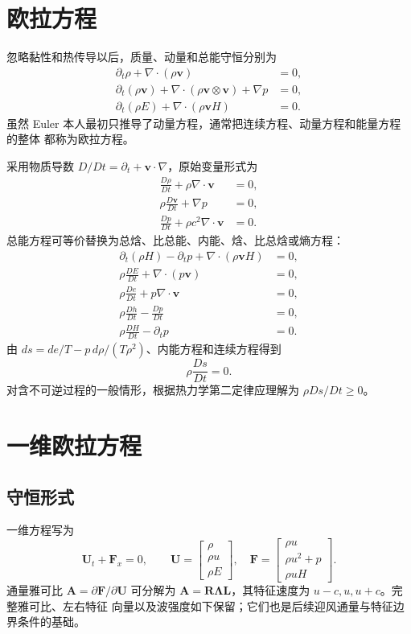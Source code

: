 \documentclass[11pt,a4paper,openany,fontset=none]{ctexbook}
\begin{document}
\section{欧拉方程}

忽略黏性和热传导以后，质量、动量和总能守恒分别为
\begin{align}
 \partial_t\rho+\nabla\cdot(\rho\bm v)&=0,\\
 \partial_t(\rho\bm v)+\nabla\cdot(\rho\bm v\otimes\bm v)+\nabla p&=0,\\
 \partial_t(\rho E)+\nabla\cdot(\rho\bm v H)&=0.
\end{align}
虽然 Euler 本人最初只推导了动量方程，通常把连续方程、动量方程和能量方程的整体
都称为欧拉方程。

采用物质导数 $D/Dt=\partial_t+\bm v\cdot\nabla$，原始变量形式为
\begin{align}
 \frac{D\rho}{Dt}+\rho\nabla\cdot\bm v&=0,\\
 \rho\frac{D\bm v}{Dt}+\nabla p&=0,\\
 \frac{Dp}{Dt}+\rho c^2\nabla\cdot\bm v&=0.
\end{align}
总能方程可等价替换为总焓、比总能、内能、焓、比总焓或熵方程：
\begin{align}
 \partial_t(\rho H)-\partial_t p+\nabla\cdot(\rho\bm vH)&=0,\\
 \rho\frac{DE}{Dt}+\nabla\cdot(p\bm v)&=0,\\
 \rho\frac{De}{Dt}+p\nabla\cdot\bm v&=0,\\
 \rho\frac{Dh}{Dt}-\frac{Dp}{Dt}&=0,\\
 \rho\frac{DH}{Dt}-\partial_t p&=0.
\end{align}
由 $ds=de/T-p\,d\rho/(T\rho^2)$、内能方程和连续方程得到
\begin{equation}
 \rho\frac{Ds}{Dt}=0.
\end{equation}
对含不可逆过程的一般情形，根据热力学第二定律应理解为
$\rho Ds/Dt\ge0$。

\section{一维欧拉方程}

\subsection{守恒形式}

一维方程写为
\begin{equation}
 \bm U_t+\bm F_x=0,
 \qquad
 \bm U=\begin{bmatrix}\rho\\ \rho u\\ \rho E\end{bmatrix},
 \quad
 \bm F=\begin{bmatrix}\rho u\\ \rho u^2+p\\ \rho uH\end{bmatrix}.
\end{equation}
通量雅可比 $\bm A=\partial\bm F/\partial\bm U$ 可分解为
$\bm A=\bm R\bm\Lambda\bm L$，其特征速度为 $u-c,u,u+c$。完整雅可比、左右特征
向量以及波强度如下保留；它们也是后续迎风通量与特征边界条件的基础。
\end{document}
